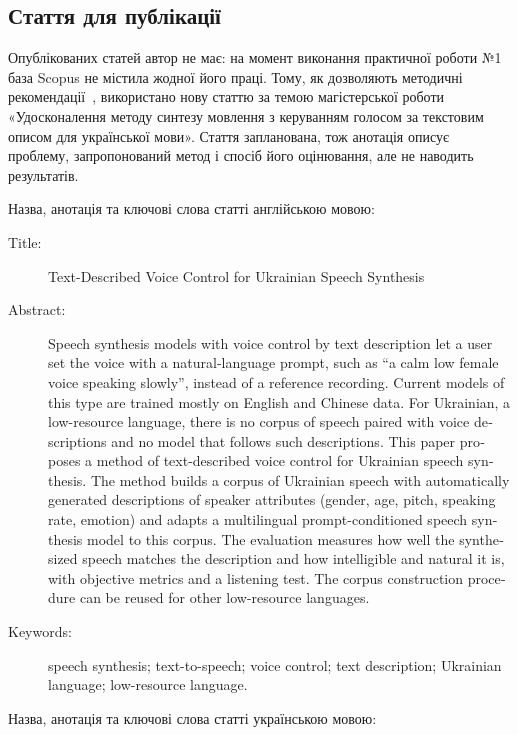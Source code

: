 \documentclass[14pt,a4paper]{extreport}
\begin{document}
\subsection{Стаття для публікації}

Опублікованих статей автор не має: на момент виконання практичної роботи №1 база Scopus не містила жодної його праці. Тому, як дозволяють методичні рекомендації~\cite{guide}, використано нову статтю за темою магістерської роботи «Удосконалення методу синтезу мовлення з керуванням голосом за текстовим описом для української мови». Стаття запланована, тож анотація описує проблему, запропонований метод і спосіб його оцінювання, але не наводить результатів.

Назва, анотація та ключові слова статті англійською мовою:

\begin{english}
\begin{description}
\item[Title:] Text-Described Voice Control for Ukrainian Speech Synthesis

\item[Abstract:] Speech synthesis models with voice control by text description let a user set the voice with a natural-language prompt, such as ``a calm low female voice speaking slowly'', instead of a reference recording. Current models of this type are trained mostly on English and Chinese data. For Ukrainian, a low-resource language, there is no corpus of speech paired with voice descriptions and no model that follows such descriptions. This paper proposes a method of text-described voice control for Ukrainian speech synthesis. The method builds a corpus of Ukrainian speech with automatically generated descriptions of speaker attributes (gender, age, pitch, speaking rate, emotion) and adapts a multilingual prompt-conditioned speech synthesis model to this corpus. The evaluation measures how well the synthesized speech matches the description and how intelligible and natural it is, with objective metrics and a listening test. The corpus construction procedure can be reused for other low-resource languages.

\item[Keywords:] speech synthesis; text-to-speech; voice control; text description; Ukrainian language; low-resource language.
\end{description}
\end{english}

Назва, анотація та ключові слова статті українською мовою:
\end{document}
